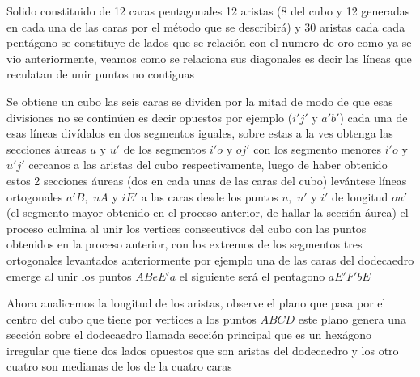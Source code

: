 Solido constituido de 12 caras pentagonales 12 aristas (8 del cubo y 12 generadas en cada una de las caras por el método que se describirá) y 30 aristas cada cada pentágono se constituye de lados que se relación con el numero de oro como  ya se vio anteriormente, veamos como  se relaciona sus diagonales  es decir las líneas que reculatan de unir puntos no contiguas

Se  obtiene un cubo las seis caras se dividen por la mitad de modo de que esas divisiones no se continúen es decir opuestos por ejemplo ($i'j'$ y $a'b'$) cada una de esas líneas  divídalos en dos segmentos iguales, sobre estas a la ves  obtenga las secciones áureas $u$ y $u'$   de los segmentos $i'o$ y $oj'$ con los segmento menores $i'o$ y $u'j'$ cercanos a las aristas del cubo respectivamente, luego de haber obtenido estos 2 secciones áureas (dos en cada unas de las caras del cubo) levántese líneas ortogonales $a'B,$ $uA$ y $iE'$ a las caras desde los puntos $u,$ $u'$ y $i'$ de longitud $ou'$ (el segmento mayor obtenido en el proceso anterior, de hallar la sección áurea) el proceso culmina al unir los vertices consecutivos del cubo con las puntos obtenidos en la proceso anterior, con los extremos de los segmentos tres ortogonales levantados anteriormente por ejemplo una de las caras del dodecaedro emerge al unir los puntos $ABeE'a$ el siguiente será el pentagono $aE'F'bE$


Ahora analicemos la longitud de los aristas, observe el plano que pasa por el centro del cubo que tiene por vertices a los puntos $ABCD$ este plano genera una sección sobre el dodecaedro llamada sección principal que es un hexágono irregular que tiene dos lados opuestos que son aristas del dodecaedro y los otro cuatro son medianas de los  de la cuatro caras


